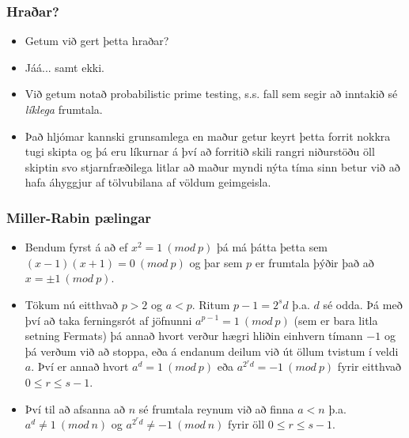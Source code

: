 \documentclass{beamer}
\begin{document}
\begin{frame}
\frametitle{Hraðar?}

\begin{itemize}

\item<1-> Getum við gert þetta hraðar?

\item<2-> Jáá... samt ekki.

\item<3-> Við getum notað probabilistic prime testing, s.s. fall sem segir að inntakið sé \textit{líklega} frumtala.

\item<4-> Það hljómar kannski grunsamlega en maður getur keyrt þetta forrit nokkra tugi skipta og þá eru líkurnar á því að forritið skili rangri niðurstöðu öll skiptin svo stjarnfræðilega litlar að maður myndi nýta tíma sinn betur við að hafa áhyggjur af tölvubilana af völdum geimgeisla.

\end{itemize}

\end{frame}

\begin{frame}
\frametitle{Miller-Rabin pælingar}

\begin{itemize}

\item<1-> Bendum fyrst á að ef $x^2 = 1 \ (mod \ p)$ þá má þátta þetta sem $(x-1)(x+1) = 0 \ (mod \ p)$ og þar sem $p$ er frumtala þýðir það að $x = \pm 1 \ (mod \ p)$.

\item<2-> Tökum nú eitthvað $p > 2$ og $a < p$. Ritum $p - 1 = 2^sd$ þ.a. $d$ sé odda. Þá með því að taka ferningsrót af jöfnunni $a^{p - 1} = 1 \ (mod \ p)$ (sem er bara litla setning Fermats) þá annað hvort verður hægri hliðin einhvern tímann $-1$ og þá verðum við að stoppa, eða á endanum deilum við út öllum tvistum í veldi $a$. Því er annað hvort $a^d = 1 \ (mod \ p)$ eða $a^{2^r d} = -1 \ (mod \ p)$ fyrir eitthvað $0 \leq r \leq s - 1$.

\item<3-> Því til að afsanna að $n$ sé frumtala reynum við að finna $a < n$ þ.a. $a^d \neq 1 \ (mod \ n)$ og $a^{2^rd} \neq -1 \ (mod \ n)$ fyrir öll $0 \leq r \leq s - 1$.

\end{itemize}

\end{frame}
\end{document}
